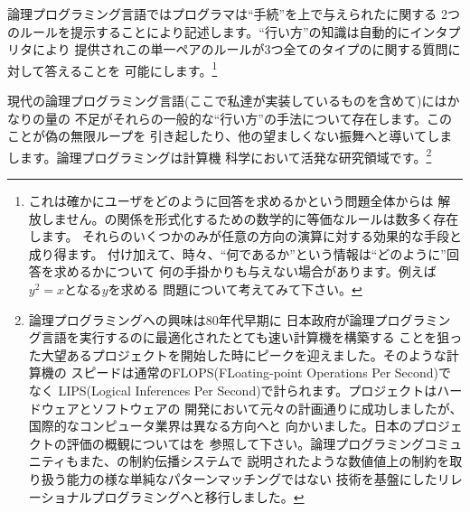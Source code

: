 \noindent
論理プログラミング言語ではプログラマは``手続''を上で与えられたに関する
2つのルールを提示することにより記述します。``行い方''の知識は自動的にインタプリタにより
提供されこの単一ペアのルールが3つ全てのタイプのに関する質問に対して答えることを
可能にします。\footnote{これは確かにユーザをどのように回答を求めるかという問題全体からは
解放しません。の関係を形式化するための数学的に等価なルールは数多く存在します。
それらのいくつかのみが任意の方向の演算に対する効果的な手段と成り得ます。
付け加えて、時々、``何であるか''という情報は``どのように''回答を求めるかについて
何の手掛かりも与えない場合があります。例えば\( y^2 = x \)となる\( y \)を求める
問題について考えてみて下さい。}


現代の論理プログラミング言語(ここで私達が実装しているものを含めて)にはかなりの量の
不足がそれらの一般的な``行い方''の手法について存在します。このことが偽の無限ループを
引き起したり、他の望ましくない振舞へと導いてしまします。論理プログラミングは計算機
科学において活発な研究領域です。\footnote{論理プログラミングへの興味は80年代早期に
日本政府が論理プログラミング言語を実行するのに最適化されたとても速い計算機を構築する
ことを狙った大望あるプロジェクトを開始した時にピークを迎えました。そのような計算機の
スピードは通常のFLOPS(FLoating-point Operations Per Second)でなく
LIPS(Logical Inferences Per Second)で計られます。プロジェクトはハードウェアとソフトウェアの
開発において元々の計画通りに成功しましたが、国際的なコンピュータ業界は異なる方向へと
向かいました。日本のプロジェクトの評価の概観についてはを
参照して下さい。論理プログラミングコミュニティもまた、の制約伝播システムで
説明されたような数値値上の制約を取り扱う能力の様な単純なパターンマッチングではない
技術を基盤にしたリレーショナルプログラミングへと移行しました。}


